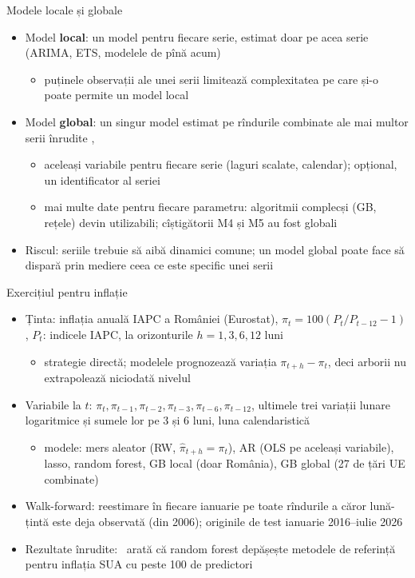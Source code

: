 \begin{frame}{Modele locale și globale}
\itemsize{\small}
\begin{itemize}
    \item Model \textbf{local}: un model pentru fiecare serie, estimat doar pe acea serie (ARIMA, ETS, modelele de pînă acum)
    \begin{itemize}
        \item puținele observații ale unei serii limitează complexitatea pe care și-o poate permite un model local
    \end{itemize}
    \item Model \textbf{global}: un singur model estimat pe rîndurile combinate ale mai multor serii înrudite , 
    \begin{itemize}
        \item aceleași variabile pentru fiecare serie (laguri scalate, calendar); opțional, un identificator al seriei
        \item mai multe date pentru fiecare parametru: algoritmii complecși (GB, rețele) devin utilizabili; cîștigătorii M4 și M5 au fost globali
    \end{itemize}
    \item Riscul: seriile trebuie să aibă dinamici comune; un model global poate face să dispară prin mediere ceea ce este specific unei serii
\end{itemize}
\end{frame}

\begin{frame}{Exercițiul pentru inflație}
\itemsize{\footnotesize}
\begin{itemize}
    \item Ținta: inflația anuală IAPC a României (Eurostat), $\pi_t = 100(P_t/P_{t-12} - 1)$, $P_t$: indicele IAPC, la orizonturile $h = 1, 3, 6, 12$ luni
    \begin{itemize}
        \item strategie directă; modelele prognozează variația $\pi_{t+h} - \pi_t$, deci arborii nu extrapolează niciodată nivelul
    \end{itemize}
    \item Variabile la $t$: $\pi_t, \pi_{t-1}, \pi_{t-2}, \pi_{t-3}, \pi_{t-6}, \pi_{t-12}$, ultimele trei variații lunare logaritmice și sumele lor pe 3 și 6 luni, luna calendaristică
    \begin{itemize}
        \item modele: mers aleator (RW, $\hat\pi_{t+h} = \pi_t$), AR (OLS pe aceleași variabile), lasso, random forest, GB local (doar România), GB global (27 de țări UE combinate)
    \end{itemize}
    \item Walk-forward: reestimare în fiecare ianuarie pe toate rîndurile a căror lună-țintă este deja observată (din 2006); originile de test ianuarie 2016--iulie 2026
    \item Rezultate înrudite: \ arată că random forest depășește metodele de referință pentru inflația SUA cu peste 100 de predictori
\end{itemize}
\end{frame}

